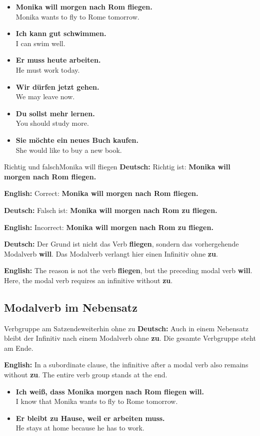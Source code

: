 \documentclass[a4paper,11pt]{article}
\newcommand{\GermanText}[1]{\textbf{Deutsch: }#1\par}
\newcommand{\EnglishText}[1]{{\small\color{SoftGray}\textbf{English: }#1\par}}
\newcommand{\ExampleItem}[2]{\item \textbf{#1}\\{\small\color{SoftGray}#2}}
\begin{document}
        \begin{exbox}
            \begin{itemize}
                \ExampleItem{Monika will morgen nach Rom fliegen.}{Monika wants to fly to Rome tomorrow.}
                \ExampleItem{Ich kann gut schwimmen.}{I can swim well.}
                \ExampleItem{Er muss heute arbeiten.}{He must work today.}
                \ExampleItem{Wir dürfen jetzt gehen.}{We may leave now.}
                \ExampleItem{Du sollst mehr lernen.}{You should study more.}
                \ExampleItem{Sie möchte ein neues Buch kaufen.}{She would like to buy a new book.}
            \end{itemize}
        \end{exbox}

        \begin{grammarentry}{Richtig und falsch}{Monika will fliegen}
            \GermanText{Richtig ist: \textbf{Monika will morgen nach Rom fliegen.}}
            \EnglishText{Correct: \textbf{Monika will morgen nach Rom fliegen.}}

            \GermanText{Falsch ist: \textbf{Monika will morgen nach Rom zu fliegen.}}
            \EnglishText{Incorrect: \textbf{Monika will morgen nach Rom zu fliegen.}}

            \GermanText{Der Grund ist nicht das Verb \textbf{fliegen}, sondern das vorhergehende Modalverb \textbf{will}. Das Modalverb verlangt hier einen Infinitiv ohne \textbf{zu}.}
            \EnglishText{The reason is not the verb \textbf{fliegen}, but the preceding modal verb \textbf{will}. Here, the modal verb requires an infinitive without \textbf{zu}.}
        \end{grammarentry}

        \subsection{Modalverb im Nebensatz}

            \begin{grammarentry}{Verbgruppe am Satzende}{weiterhin ohne zu}
                \GermanText{Auch in einem Nebensatz bleibt der Infinitiv nach einem Modalverb ohne \textbf{zu}. Die gesamte Verbgruppe steht am Ende.}
                \EnglishText{In a subordinate clause, the infinitive after a modal verb also remains without \textbf{zu}. The entire verb group stands at the end.}
            \end{grammarentry}

            \begin{exbox}
                \begin{itemize}
                    \ExampleItem{Ich weiß, dass Monika morgen nach Rom fliegen will.}{I know that Monika wants to fly to Rome tomorrow.}
                    \ExampleItem{Er bleibt zu Hause, weil er arbeiten muss.}{He stays at home because he has to work.}
                \end{itemize}
            \end{exbox}
\end{document}

